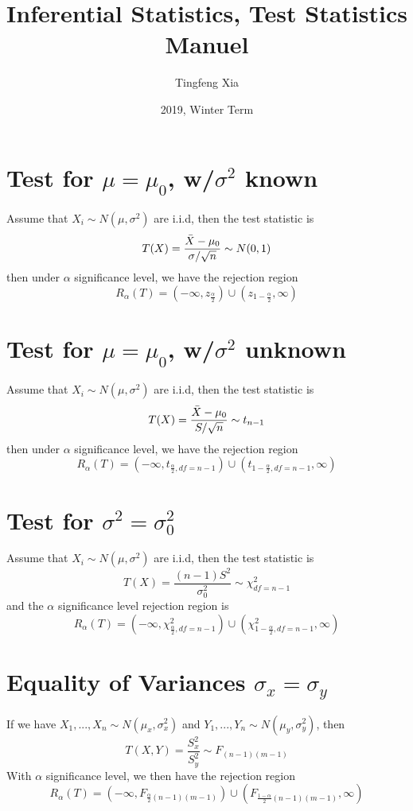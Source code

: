 \documentclass{article}
\title{Inferential Statistics, Test Statistics Manuel}
\author{Tingfeng Xia}
\date{2019, Winter Term}
\begin{document}
\maketitle
\section{Test for $\mu = \mu_0$, w/$\sigma^2$ known}
Assume that $X_i\sim N(\mu, \sigma^2)$ are i.i.d, then the test 
statistic is
\begin{equation*}
    T(X) = \frac{\Bar{X} - \mu_0}{\sigma / \sqrt{n}} \sim N(0, 1)
\end{equation*}
then under $\alpha$ significance level, we have the rejection region
\begin{equation*}
    R_\alpha(T) = ( -\infty, z_{\frac{\alpha}{2}} ) \cup 
(z_{1-\frac{\alpha}{2}}, \infty )
\end{equation*}

\section{Test for $\mu = \mu_0$, w/$\sigma^2$ unknown}
Assume that $X_i\sim N(\mu, \sigma^2)$ are i.i.d, then the test 
statistic is
\begin{equation*}
    T(X) = \frac{\Bar{X} - \mu_0}{S / \sqrt{n}} \sim t_{n-1}
\end{equation*}
then under $\alpha$ significance level, we have the rejection region
\begin{equation*}
    R_\alpha(T) = ( -\infty, t_{\frac{\alpha}{2}, df=n-1} ) \cup 
(t_{1-\frac{\alpha}{2}, df=n-1}, \infty )
\end{equation*}

\section{Test for $\sigma^2 = \sigma_0^2$}
Assume that $X_i\sim N(\mu, \sigma^2)$ are i.i.d, then the test 
statistic is
\begin{equation*}
    T(X) = \frac{(n-1)S^2}{\sigma_0^2} \sim \chi^2_{df = n-1}
\end{equation*}
and the $\alpha$ significance level rejection region is 
\begin{equation*}
    R_\alpha(T) = ( -\infty, \chi^2_{\frac{\alpha}{2}, df=n-1} ) \cup 
(\chi^2_{1-\frac{\alpha}{2}, df=n-1}, \infty )
\end{equation*}

\section{Equality of Variances $\sigma_x = \sigma_y$}
If we have $X_1,...,X_n\sim N(\mu_x, \sigma^2_x)$ and $Y_1,...,Y_n\sim 
N(\mu_y, \sigma^2_y)$, then
\begin{equation*}
    T(X,Y) = \frac{S_x^2}{S_y^2} \sim F_{(n-1)(m-1)}
\end{equation*}
With $\alpha$ significance level, we then have the rejection region
\begin{equation*}
     R_\alpha(T) = \left(-\infty,F_{\frac{\alpha}{2}(n-1)(m-1)}\right) 
\cup \left(F_{\frac{1-\alpha}{2}(n-1)(m-1)}, \infty\right) 
\end{equation*}
\end{document}
